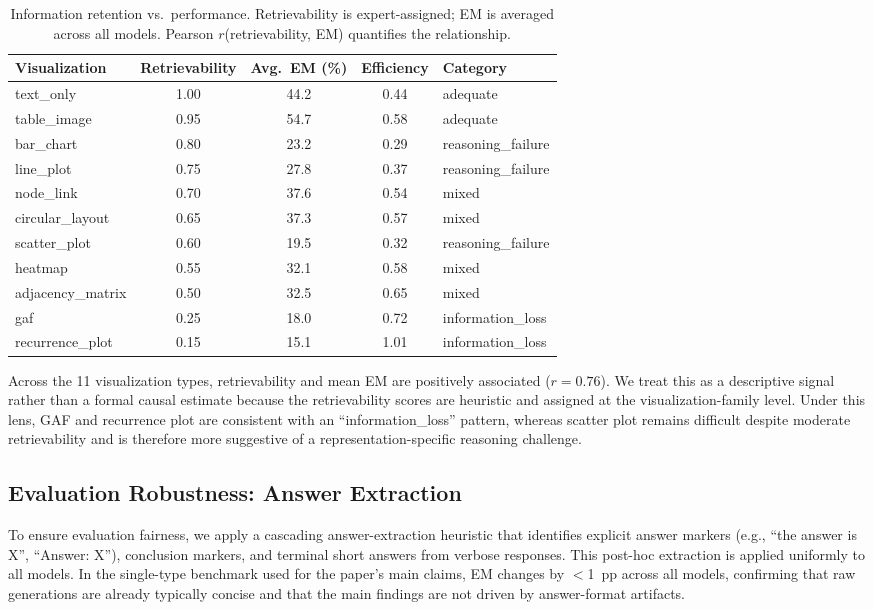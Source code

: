 \documentclass{article}
\begin{document}
\begin{table}[t]
\centering
\small
\caption{Information retention vs.\ performance. Retrievability is expert-assigned; EM is averaged across all models. Pearson $r$(retrievability, EM) quantifies the relationship.}
\label{tab:retention}
\begin{tabular}{lcccl}
\toprule
Visualization & Retrievability & Avg.\ EM (\%) & Efficiency & Category \\
\midrule
text\_only & 1.00 & 44.2 & 0.44 & adequate \\
table\_image & 0.95 & 54.7 & 0.58 & adequate \\
bar\_chart & 0.80 & 23.2 & 0.29 & reasoning\_failure \\
line\_plot & 0.75 & 27.8 & 0.37 & reasoning\_failure \\
node\_link & 0.70 & 37.6 & 0.54 & mixed \\
circular\_layout & 0.65 & 37.3 & 0.57 & mixed \\
scatter\_plot & 0.60 & 19.5 & 0.32 & reasoning\_failure \\
heatmap & 0.55 & 32.1 & 0.58 & mixed \\
adjacency\_matrix & 0.50 & 32.5 & 0.65 & mixed \\
gaf & 0.25 & 18.0 & 0.72 & information\_loss \\
recurrence\_plot & 0.15 & 15.1 & 1.01 & information\_loss \\
\bottomrule
\end{tabular}
\end{table}

Across the 11 visualization types, retrievability and mean EM are positively associated ($r = 0.76$). We treat this as a descriptive signal rather than a formal causal estimate because the retrievability scores are heuristic and assigned at the visualization-family level. Under this lens, GAF and recurrence plot are consistent with an ``information\_loss'' pattern, whereas scatter plot remains difficult despite moderate retrievability and is therefore more suggestive of a representation-specific reasoning challenge.

\subsection{Evaluation Robustness: Answer Extraction}
To ensure evaluation fairness, we apply a cascading answer-extraction heuristic that identifies explicit answer markers (e.g., ``the answer is X'', ``Answer: X''), conclusion markers, and terminal short answers from verbose responses. This post-hoc extraction is applied uniformly to all models. In the single-type benchmark used for the paper's main claims, EM changes by $<$1~pp across all models, confirming that raw generations are already typically concise and that the main findings are not driven by answer-format artifacts.
\end{document}
